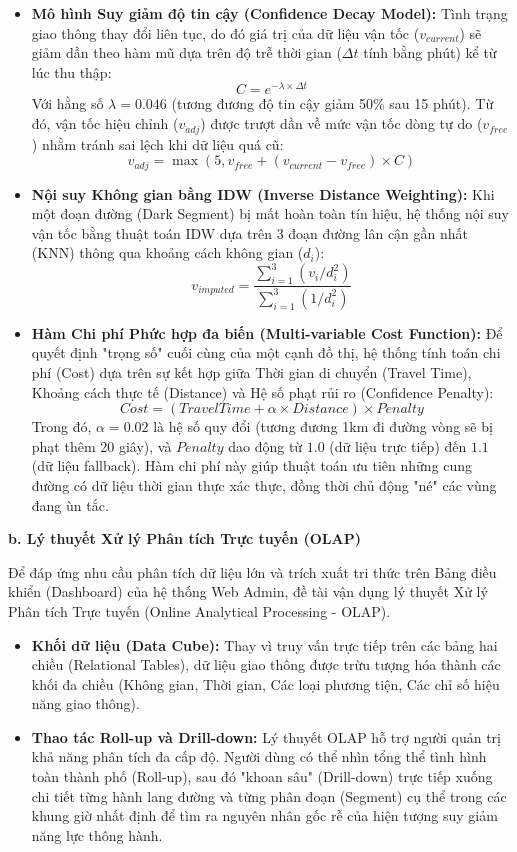 \begin{itemize}
    \item \textbf{Mô hình Suy giảm độ tin cậy (Confidence Decay Model):} Tình trạng giao thông thay đổi liên tục, do đó giá trị của dữ liệu vận tốc ($v_{current}$) sẽ giảm dần theo hàm mũ dựa trên độ trễ thời gian ($\Delta t$ tính bằng phút) kể từ lúc thu thập:
    $$C = e^{-\lambda \times \Delta t}$$
    Với hằng số $\lambda = 0.046$ (tương đương độ tin cậy giảm 50\% sau 15 phút). Từ đó, vận tốc hiệu chỉnh ($v_{adj}$) được trượt dần về mức vận tốc dòng tự do ($v_{free}$) nhằm tránh sai lệch khi dữ liệu quá cũ:
    $$v_{adj} = \max(5, v_{free} + (v_{current} - v_{free}) \times C)$$
    
    \item \textbf{Nội suy Không gian bằng IDW (Inverse Distance Weighting):} Khi một đoạn đường (Dark Segment) bị mất hoàn toàn tín hiệu, hệ thống nội suy vận tốc bằng thuật toán IDW dựa trên 3 đoạn đường lân cận gần nhất (KNN) thông qua khoảng cách không gian ($d_i$):
    $$v_{imputed} = \frac{\sum_{i=1}^{3} (v_i / d_i^2)}{\sum_{i=1}^{3} (1 / d_i^2)}$$
    
    \item \textbf{Hàm Chi phí Phức hợp đa biến (Multi-variable Cost Function):} Để quyết định "trọng số" cuối cùng của một cạnh đồ thị, hệ thống tính toán chi phí (Cost) dựa trên sự kết hợp giữa Thời gian di chuyển (Travel Time), Khoảng cách thực tế (Distance) và Hệ số phạt rủi ro (Confidence Penalty):
    $$Cost = (TravelTime + \alpha \times Distance) \times Penalty$$
    Trong đó, $\alpha = 0.02$ là hệ số quy đổi (tương đương 1km đi đường vòng sẽ bị phạt thêm 20 giây), và $Penalty$ dao động từ $1.0$ (dữ liệu trực tiếp) đến $1.1$ (dữ liệu fallback). Hàm chi phí này giúp thuật toán ưu tiên những cung đường có dữ liệu thời gian thực xác thực, đồng thời chủ động "né" các vùng đang ùn tắc.
\end{itemize}

\textbf{b. Lý thuyết Xử lý Phân tích Trực tuyến (OLAP)}

Để đáp ứng nhu cầu phân tích dữ liệu lớn và trích xuất tri thức trên Bảng điều khiển (Dashboard) của hệ thống Web Admin, đề tài vận dụng lý thuyết Xử lý Phân tích Trực tuyến (Online Analytical Processing - OLAP).
\begin{itemize}
    \item \textbf{Khối dữ liệu (Data Cube):} Thay vì truy vấn trực tiếp trên các bảng hai chiều (Relational Tables), dữ liệu giao thông được trừu tượng hóa thành các khối đa chiều (Không gian, Thời gian, Các loại phương tiện, Các chỉ số hiệu năng giao thông).
    \item \textbf{Thao tác Roll-up và Drill-down:} Lý thuyết OLAP hỗ trợ người quản trị khả năng phân tích đa cấp độ. Người dùng có thể nhìn tổng thể tình hình toàn thành phố (Roll-up), sau đó "khoan sâu" (Drill-down) trực tiếp xuống chi tiết từng hành lang đường và từng phân đoạn (Segment) cụ thể trong các khung giờ nhất định để tìm ra nguyên nhân gốc rễ của hiện tượng suy giảm năng lực thông hành.
\end{itemize}

